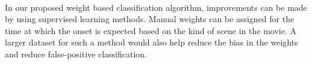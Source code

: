 \paragraph{} In our proposed weight based classification algorithm, improvements can be made by using supervised learning methods. Manual weights can be assigned for the time at which the onset is expected based on the kind of scene in the movie. A larger dataset for such a method would also help reduce the bias in the weights and reduce false-positive classification.  


